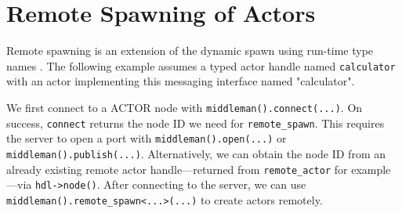 \section{Remote Spawning of Actors \experimental}
\label{remote-spawn}

Remote spawning is an extension of the dynamic spawn using run-time type names
. The following example assumes a typed actor handle
named \lstinline^calculator^ with an actor implementing this messaging
interface named "calculator".


We first connect to a ACTOR node with \lstinline^middleman().connect(...)^. On
success, \lstinline^connect^ returns the node ID we need for
\lstinline^remote_spawn^. This requires the server to open a port with
\lstinline^middleman().open(...)^ or \lstinline^middleman().publish(...)^.
Alternatively, we can obtain the node ID from an already existing remote actor
handle---returned from \lstinline^remote_actor^ for example---via
\lstinline^hdl->node()^. After connecting to the server, we can use
\lstinline^middleman().remote_spawn<...>(...)^ to create actors remotely.
